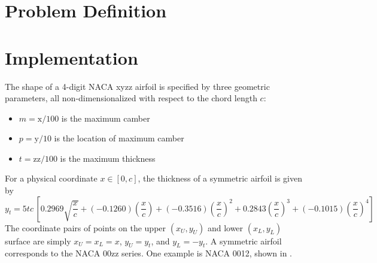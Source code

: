 \documentclass[11pt]{article}
\begin{document}
\section{Problem Definition}

\section{Implementation}

The shape of a 4-digit NACA xyzz airfoil is specified by three geometric parameters, all non-dimensionalized with respect to the chord length $c$:
\begin{itemize}
\item $m = \text{x} / 100$ is the maximum camber
\item $p = \text{y} / 10$ is the location of maximum camber
\item $t = \text{zz}/100$ is the maximum thickness
\end{itemize}

For a physical coordinate $x \in [0, c]$, the thickness of a symmetric airfoil is given by
\begin{equation}
y_t = 5tc\, \left[ 0.2969 \sqrt{\frac{x}{c}} + (-0.1260) \left(\frac{x}{c}\right) + (-0.3516) \left(\frac{x}{c}\right)^2 + 0.2843 \left(\frac{x}{c}\right)^3 + (-0.1015) \left( \frac{x}{c} \right)^4 \right]
\end{equation}
The coordinate pairs of points on the upper $(x_U, y_U)$ and lower $(x_L, y_L)$ surface are simply $x_U = x_L = x$, $y_U = y_t$, and $y_L = -y_t$. A symmetric airfoil corresponds to the NACA 00zz series. One example is NACA 0012, shown in .
\end{document}
